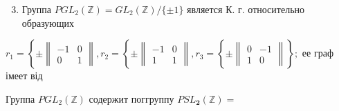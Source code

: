 \documentclass[10pt]{article}
\begin{document}
\begin{enumerate}

  \setcounter{enumi}{2}

  \item Группа $P G L_{2}(\mathbb{Z})=G L_{2}(\mathbb{Z}) /\{ \pm 1\}$ является К. г. относительно образующих

\end{enumerate}



$r_{1}=\left\{ \pm\left\|\begin{array}{rr}-1 & 0 \\ 0 & 1\end{array}\right\|, r_{2}=\left\{ \pm\left\|\begin{array}{rr}-1 & 0 \\ 1 & 1\end{array}\right\|, r_{3}=\left\{ \pm\left\|\begin{array}{rr}0 & -1 \\ 1 & 0\end{array}\right\|\right\} ;\right.\right.$ ее граф імеет від



Группа $P G L_{2}(\mathbb{Z})$ содержит поггруппу $P S L_{\mathbf{2}}(\mathbb{Z})=$
\end{document}
